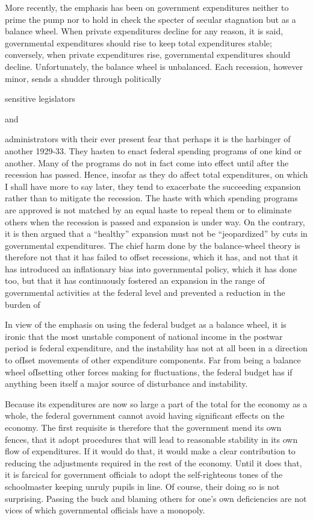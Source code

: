 \documentclass[11pt,openany]{book}
\begin{document}
More recently, the emphasis has been on government expenditures neither to prime the pump nor to hold in check the specter of secular stagnation but as a balance wheel. When private expenditures decline for any reason, it is said, governmental expenditures should rise to keep total expenditures stable; conversely, when private expenditures rise, governmental expenditures should decline. Unfortunately, the balance wheel is unbalanced. Each recession, however minor, sends a shudder through politically

sensitive legislators

and

administrators with their ever present fear that perhaps it is the harbinger of another 1929-33. They hasten to enact federal spending programs of one kind or another. Many of the programs do not in fact come into effect until after the recession has passed. Hence, insofar as they do affect total expenditures, on which I shall have more to say later, they tend to exacerbate the succeeding expansion rather than to mitigate the recession. The haste with which spending programs are approved is not matched by an equal haste to repeal them or to eliminate others when the recession is passed and expansion is under way. On the contrary, it is then argued that a ``healthy'' expansion must not be ``jeopardized'' by cuts in governmental expenditures. The chief harm done by the balance-wheel theory is therefore not that it has failed to offset recessions, which it has, and not that it has introduced an inflationary bias into governmental policy, which it has done too, but that it has continuously fostered an expansion in the range of governmental activities at the federal level and prevented a reduction in the burden of

In view of the emphasis on using the federal budget as a balance wheel, it is ironic that the most unstable component of national income in the postwar period is federal expenditure, and the instability has not at all been in a direction to ofIset movements of other expenditure components. Far from being a balance wheel ofIsetting other forces making for fluctuations, the federal budget has if anything been itself a major source of disturbance and instability.

Because its expenditures are now so large a part of the total for the economy as a whole, the federal government cannot avoid having significant effects on the economy. The first requisite is therefore that the government mend its own fences, that it adopt procedures that will lead to reasonable stability in its own flow of expenditures. If it would do that, it would make a clear contribution to reducing the adjustments required in the rest of the economy. Until it does that, it is farcical for government officials to adopt the self-righteous tones of the schoolmaster keeping unruly pupils in line. Of course, their doing so is not surprising. Passing the buck and blaming others for one's own deficiencies are not vices of which governmental officials have a monopoly.
\end{document}
